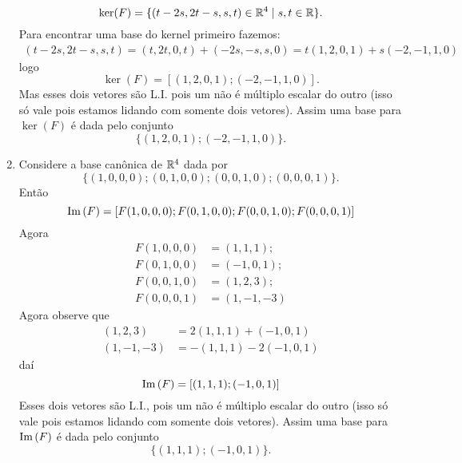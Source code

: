 \documentclass[12pt]{exam}
\begin{document}
\begin{enumerate}[label={\alph*})]
            \[
                \ker(F) = \{(t - 2s, 2t - s, s, t) \in \mathbb{R}^4 \mid s, t \in \mathbb{R}\}.
            \]
            Para encontrar uma base do kernel primeiro fazemos:
            \begin{align*}
                (t - 2s, 2t - s, s, t) = (t, 2t, 0, t) + (-2s, -s, s, 0) = t(1, 2, 0, 1) + s(-2, -1, 1, 0)
            \end{align*}
            logo
            \[
                \ker(F) = [(1, 2, 0, 1); (-2, -1, 1, 0)].
            \]
            Mas esses dois vetores são L.I. pois um não é múltiplo escalar do outro (isso só vale pois estamos lidando com somente
            dois vetores). Assim uma base para $\ker(F)$ é dada pelo conjunto
            \[
                \{(1, 2, 0, 1); (-2, -1, 1, 0)\}.
            \]

        \item Considere a base canônica de $\mathbb{R}^4$ dada por
            \[
                \{(1, 0, 0, 0); (0, 1, 0, 0); (0, 0, 1, 0); (0, 0, 0, 1)\}.
            \]
            Então
            \[
                {\rm Im\,}(F) = [F(1, 0, 0, 0); F(0, 1, 0, 0); F(0, 0, 1, 0); F(0, 0, 0, 1)]
            \]
            Agora
            \begin{align*}
                F(1, 0, 0, 0) &= (1, 1, 1);\\
                F(0, 1, 0, 0) &= (-1, 0, 1);\\
                F(0, 0, 1, 0) &= (1, 2, 3);\\
                F(0, 0, 0, 1) &= (1, -1, -3)
            \end{align*}
            Agora observe que
            \begin{align*}
                (1, 2, 3) &= 2(1, 1, 1) + (-1, 0, 1)\\
                (1, -1, -3) &= -(1, 1, 1) - 2(-1, 0, 1)
            \end{align*}
            daí
            \[
                {\rm Im\,}(F) = [(1, 1, 1); (-1, 0, 1)]
            \]
            Esses dois vetores são L.I., pois um não é múltiplo escalar do outro (isso só vale pois estamos lidando com somente
            dois vetores). Assim uma base para ${\rm Im\,}(F)$ é dada pelo conjunto
            \[
                \{(1, 1, 1); (-1, 0, 1)\}.
            \]


    \end{enumerate}
\end{document}
